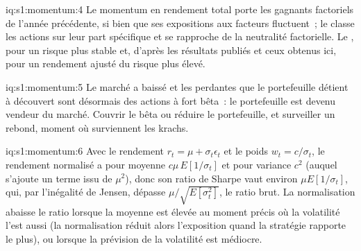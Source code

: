 \begin{solution}{iq:s1:momentum:4}
Le momentum en rendement total porte les gagnants factoriels de l'année précédente, si bien que ses expositions aux facteurs fluctuent~; le  classe les actions sur leur part spécifique et se rapproche
de la neutralité factorielle. Le , pour un risque plus stable et, d'après les résultats publiés et ceux obtenus ici, pour un rendement ajusté du risque plus élevé.
\end{solution}

\begin{solution}{iq:s1:momentum:5}
Le marché a baissé et les perdantes que le portefeuille détient à découvert sont désormais des actions à fort bêta~: le portefeuille est devenu vendeur du marché. Couvrir le bêta ou réduire le portefeuille,
et surveiller un rebond, moment où surviennent les krachs.
\end{solution}

\begin{solution}{iq:s1:momentum:6}
Avec le rendement $r_t = \mu + \sigma_t\epsilon_t$ et le poids $w_t = c/\sigma_t$, le rendement normalisé a pour moyenne $c\mu\,E[1/\sigma_t]$ et pour variance $c^2$ (auquel s'ajoute un terme
issu de $\mu^2$), donc son ratio de Sharpe vaut environ $\mu E[1/\sigma_t]$, qui, par l'inégalité de Jensen, dépasse $\mu/\sqrt{E[\sigma_t^2]}$, le ratio brut. La normalisation abaisse le
ratio lorsque la moyenne est élevée au moment précis où la volatilité l'est aussi (la normalisation réduit alors l'exposition quand la stratégie rapporte le plus), ou lorsque la prévision de la volatilité est médiocre.
\end{solution}
